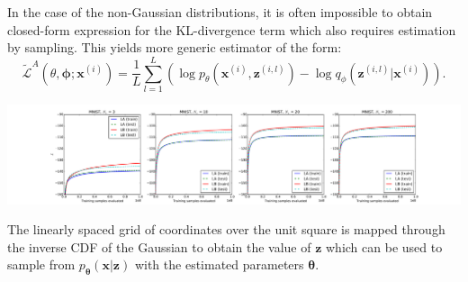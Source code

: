 \documentclass[landscape,a0b,final,a4resizeable]{include/a0poster}
\begin{document}
\begin{poster}
\begin{multicols}{3}
In the case of the non-Gaussian distributions, it is often impossible to obtain closed-form expression for the KL-divergence term which also requires estimation by sampling. This yields more generic estimator of the form:
$$ \widetilde{\mathcal{L}}^{A}(\theta, \boldsymbol{\phi}; \mathbf{x}^{(i)}) = \frac{1}{L} \sum_{l=1}^L \left( \log p_{\theta}(\mathbf{x}^{(i)}, \mathbf{z}^{(i,l)}) - \log q_{\phi}(\mathbf{z}^{(i,l)} | \mathbf{x}^{(i)}) \right).$$

\vspace{0.5em}

\begin{center}
\includegraphics[width=1\columnwidth]{../res/mnist_LAvsLB}
\end{center}

\vspace{0.5em}


The linearly spaced grid of coordinates over the unit square is mapped through the inverse CDF of the Gaussian to obtain the value of $\mathbf{z}$ which can be used to sample from $p_{\mathbf{\theta}} (\mathbf{x}| \mathbf{z})$ with the estimated parameters $\boldsymbol{\theta}$.

\vspace{0.5em}


\end{multicols}
\end{poster}
\end{document}
